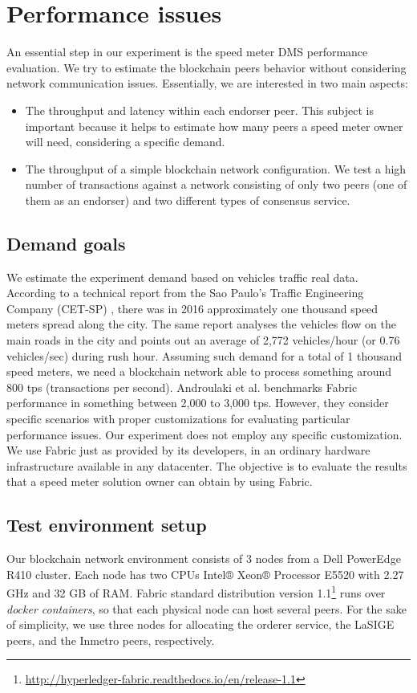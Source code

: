\documentclass[journal]{IEEEtran}
\begin{document}
\section{Performance issues}
An essential step in our experiment is the speed meter DMS performance evaluation.
We try to estimate the blockchain peers behavior without considering network communication issues.
Essentially, we are interested in two main aspects:
\begin{itemize}
   \item{The throughput and latency within each endorser peer. This subject is important because it helps to estimate how many peers a speed meter owner will need, considering a specific demand.}
   \item{The throughput of a simple blockchain network configuration. We test a high number of transactions against a network consisting of only two peers (one of them as an endorser) and two different types of consensus service.}
\end{itemize}

\subsection{Demand goals}
We estimate the experiment demand based on vehicles traffic real data.
According to a technical report from the Sao Paulo's Traffic Engineering Company 
(CET-SP) \cite{CompanhiadeEngenhariadeTrafego-CET2017}, there was in 2016 approximately one thousand speed meters spread along the city.
The same report analyses the vehicles flow on the main roads in the city and points out an average of 2,772 vehicles/hour (or 0.76 vehicles/sec) during rush hour.
Assuming such demand for a total of 1 thousand speed meters, we need a blockchain network able to process something around 800 tps (transactions per second).
Androulaki et al. \cite{Androulaki2018} benchmarks Fabric performance in something between 2,000 to 3,000 tps.
However, they consider specific scenarios with proper customizations for evaluating particular performance issues.
Our experiment does not employ any specific customization.
We use Fabric just as provided by its developers, in an ordinary hardware infrastructure available in any datacenter.
The objective is to evaluate the results that a speed meter solution owner can obtain by using Fabric.

\subsection{Test environment setup}
Our blockchain network environment consists of 3 nodes from a Dell PowerEdge R410 cluster.
Each node has two CPUs Intel® Xeon® Processor E5520 with 2.27 GHz and 32 GB of RAM.
Fabric standard distribution version 1.1\footnote{\url{http://hyperledger-fabric.readthedocs.io/en/release-1.1}} runs over \emph{docker containers}, so that each physical node can host several peers.
For the sake of simplicity, we use three nodes for allocating the orderer service, the LaSIGE peers, and the Inmetro peers, respectively.
\end{document}
